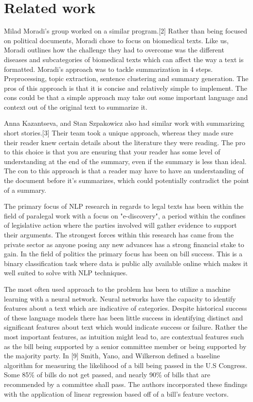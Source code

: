 \documentclass[11pt,a4paper]{article}
\begin{document}
\section{Related work}
Milad Moradi’s group worked on a similar program.[2]
Rather than being focused on political documents, Moradi chose to focus on biomedical texts. Like us, Moradi outlines how the challenge they had to overcome was the different diseases and subcategories of biomedical texts which can affect the way a text is formatted. Moradi’s approach was to tackle summarization in 4 steps. Preprocessing, topic extraction, sentence clustering and summary generation. The pros of this approach is that it is concise and relatively simple to implement. The cons could be that a simple approach may take out some important language and context out of the original text to summarize it.  

Anna Kazantseva, and Stan Szpakowicz also had similar work with summarizing short stories.[3] Their team took a unique approach, whereas they made sure their reader knew certain details about the literature they were reading. The pro to this choice is that you are ensuring that your reader has some level of understanding at the end of the summary, even if the summary is less than ideal. The con to this approach is that a reader may have to have an understanding of the document before it’s summarizes, which could potentially contradict the point of a summary.  

The primary focus of NLP research in regards to legal texts has been within the field of paralegal work with a focus on "e-discovery", a  period within the confines of legislative action where the parties involved will gather evidence to support their arguments. The strongest forces within this research has came from the private sector as anyone posing any new advances has a strong financial stake to gain. In the field of politics the primary focus has been on bill success. This is a binary classification task where data is public ally available online which makes it well suited to solve with NLP techniques.

The most often used approach to the problem has been to utilize a machine learning with a neural network. Neural networks have the capacity to identify features about a text which are indicative of categories. Despite historical success of these language models there has been little success in identifying distinct and significant features about text which would indicate success or failure. Rather the most important features, as intuition might lead to, are contextual features such as the bill being supported by a senior committee member or being supported by the majority party.
In [9] Smith, Yano, and Wilkerson defined a baseline algorithm for measuring the likelihood of a bill being passed in the U.S Congress. Some 85\% of bills do not get passed, and nearly 90\% of bills that are recommended by a committee shall pass. The authors incorporated these findings with the application of linear regression based off of a bill's feature vectors.
\end{document}
